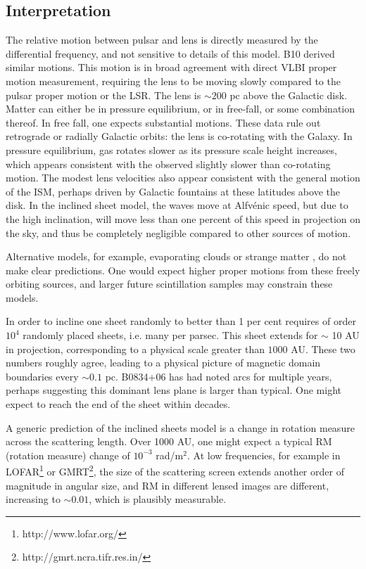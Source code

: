 \documentclass[useAMS,usenatbib]{mn2e}
\begin{document}
\subsection{Interpretation}

The relative motion between pulsar and lens is directly measured by
the differential frequency, and not sensitive to details of this
model. B10 derived similar motions.  This
motion is in broad agreement with direct VLBI proper motion
measurement, requiring the lens to be moving slowly compared to the
pulsar proper motion or the LSR.  The lens is $\sim200$ pc above the
Galactic disk.  Matter can either be in pressure equilibrium, or in
free-fall, or some combination thereof.  In free fall, one expects
substantial motions.  These data rule out retrograde or radially
Galactic orbits: the lens is co-rotating with the Galaxy.  In pressure
equilibrium, gas rotates slower as its pressure scale height
increases, which appears consistent with the observed slightly slower
than co-rotating motion.  The modest lens velocities also appear
consistent with the general motion of the ISM, perhaps driven by
Galactic fountains \citep{1976ApJ...205..762S} at these latitudes above
the disk.  In the inclined sheet model, the waves move at Alfv\'enic
speed, but due to the high inclination, will move less than one percent of this
speed in projection on the sky, and thus be completely negligible compared to
other sources of motion.

Alternative models, for example, evaporating
clouds \citep{1998ApJ...498L.125W} or strange
matter \citep{2013PhLB..727..357P}, do not make clear predictions.  One
would expect higher proper motions from these freely orbiting sources,
and larger future scintillation samples may constrain these models.

In order to incline one sheet randomly to better than 1 per cent requires of
order $10^4$ randomly placed sheets, i.e. many per parsec.  This sheet
extends for $\sim$ 10 AU in projection, corresponding to a physical
scale greater than $1000$ AU.   These two numbers roughly agree,
leading to a physical picture of magnetic domain boundaries every
$\sim 0.1$ pc.  B0834+06 has had noted arcs for multiple years,
perhaps suggesting this dominant lens plane is larger than typical.
One might expect to reach the end of the sheet within decades.

A generic prediction of the inclined sheets model is a change in rotation
measure across the scattering length.  Over 1000 AU, one might expect
a typical RM (rotation measure) change of $10^{-3}$ rad/m$^2$.  At low frequencies, for
example in LOFAR\footnote{http://www.lofar.org/} or GMRT\footnote{http://gmrt.ncra.tifr.res.in/}, the size of the scattering screen extends
another order of magnitude in angular size, and RM in different lensed images are different, increasing to
$\sim 0.01$, which is plausibly measurable.
\end{document}

